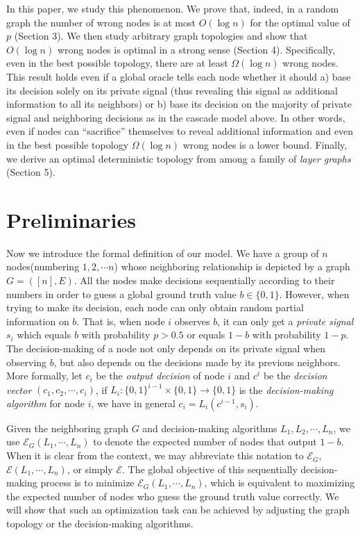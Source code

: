 \documentclass[a4paper,UKenglish]{lipics}
\theoremstyle{definition}
\begin{document}
In this paper, we study this phenomenon. 
We prove that, indeed, in a random graph the number of wrong nodes is at most $O(\log n)$ for the optimal value of $p$ (Section 3). 
We then study arbitrary graph topologies and show that $O(\log n)$ wrong nodes is optimal in a strong sense (Section 4). 
Specifically, even in the best possible topology, there are at least $\Omega(\log n)$ wrong nodes. 
This result holds even if a global oracle tells each node whether it should 
	a) base its decision solely on its private signal (thus revealing this signal as additional information to all its neighbors) or 
	b) base its decision on the majority of private signal and neighboring decisions as in the cascade model above. 
In other words, even if nodes can ``sacrifice'' themselves to reveal additional information 
	and even in the best possible topology $\Omega(\log n)$ wrong nodes is a lower bound. 
Finally, we derive an optimal deterministic topology from among a family of \emph{layer graphs} (Section 5).








\section{Preliminaries}

Now we introduce the formal definition of our model. 
We have a group of $n$ nodes(numbering $1,2,\cdots n$) whose neighboring relationship is depicted by a graph $G = ([n],E)$. 
All the nodes make decisions sequentially according to their numbers in order to guess a global ground truth value $b\in\{0,1\}$. 
However, when trying to make its decision, each node can only obtain random partial information on $b$. 
That is, when node $i$ observes $b$, 
	it can only get a \emph{private signal} $s_i$ which equals $b$ with probability $p>0.5$ or equals $1-b$ with probability $1-p$.  
The decision-making of a node not only depends on its private signal when observing $b$, 
	but also depends on the decisions made by its previous neighbors. 
More formally, let $c_i$ be the \emph{output decision} of node $i$ and $c^i$ be the \emph{decision vector} $(c_1, c_2, \cdots, c_i)$, 
	if $ L_i : \{0,1\}^{i-1}\times \{0,1\} \to \{0,1\} $ is the \emph{decision-making algorithm} for node $i$,  we have in general $c_i = L_i(c^{i-1}, s_i)$.

Given the neighboring graph $G$ and decision-making algorithms $L_1, L_2, \cdots, L_n$, 
	we use $\mathcal{E}_G(L_1, \dotsb, L_n)$ to denote the expected number of nodes that output $1 - b$. 
When it is clear from the context, we may abbreviate this notation to $\mathcal{E}_G$,
	$\mathcal{E}(L_1, \dotsb, L_n)$, or simply $\mathcal{E}$. 
The global objective of this sequentially decision-making process is to minimize $\mathcal{E}_G(L_1, \dotsb, L_n)$, 
	which is equivalent to maximizing the expected number of nodes who guess the ground truth value correctly. 
We will show that such an optimization task can be achieved by adjusting the graph topology or the decision-making algorithms. 
\end{document}
